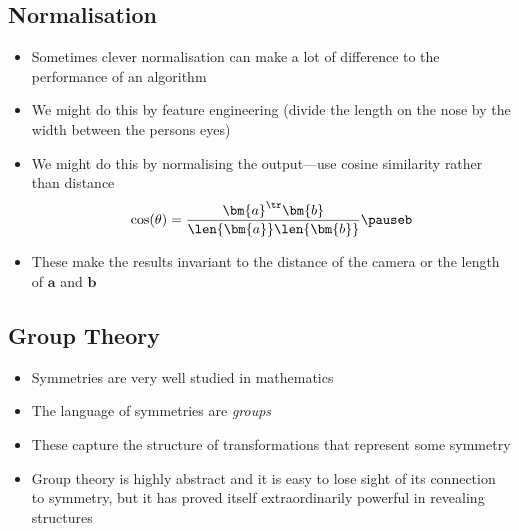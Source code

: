 \begin{slide}
\section{Normalisation}

\begin{PauseHighLight}
  \begin{itemize}
  \item Sometimes clever normalisation can make a lot of difference to
    the performance of an algorithm\pause
  \item We might do this by feature engineering\pause{} (divide the length on
    the nose by the width between the persons eyes)\pauseb
  \item We might do this by normalising the output\pause---use cosine
    similarity rather than distance
    \begin{align*}
      \cos(\theta) = \frac{\bm{a}^\tr \bm{b}}{\len{\bm{a}}\len{\bm{b}}}\pauseb
    \end{align*}
  \item These make the results invariant\pauseb{} to the distance of
    the camera\pauseb{} or the length of $\bm{a}$ and $\bm{b}$\pauseb
  \end{itemize}
\end{PauseHighLight}

\end{slide}

\Outline %

\begin{slide}
\section{Group Theory}

\begin{PauseHighLight}
  \begin{itemize}
  \item Symmetries are very well studied in mathematics\pause
  \item The language of symmetries are \emph{groups}\pause
  \item These capture the structure of transformations that represent
    some symmetry\pause
  \item Group theory is highly abstract and it is easy to lose sight
    of its connection to symmetry, but it has proved itself
    extraordinarily powerful in revealing structures\pause
  \end{itemize}
\end{PauseHighLight}

\end{slide}

